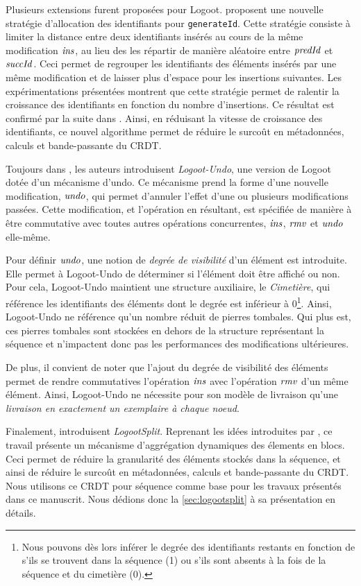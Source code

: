 Plusieurs extensions furent proposées pour Logoot.
\textcite{2010-logoot-undo-weiss} proposent une nouvelle stratégie d'allocation des identifiants pour \texttt{generateId}.
Cette stratégie consiste à limiter la distance entre deux identifiants insérés au cours de la même modification $\mathit{ins}$, au lieu des les répartir de manière aléatoire entre $\mathit{predId}$ et $\mathit{succId}$.
Ceci permet de regrouper les identifiants des éléments insérés par une même modification et de laisser plus d'espace pour les insertions suivantes.
Les expérimentations présentées montrent que cette stratégie permet de ralentir la croissance des identifiants en fonction du nombre d'insertions.
Ce résultat est confirmé par la suite dans \cite{2011-evaluation-crdts-ahmed-nacer}.
Ainsi, en réduisant la vitesse de croissance des identifiants, ce nouvel algorithme permet de réduire le surcoût en métadonnées, calculs et bande-passante du \ac{CRDT}.

Toujours dans \cite{2010-logoot-undo-weiss}, les auteurs introduisent \emph{Logoot-Undo}, une version de Logoot dotée d'un mécanisme d'undo.
Ce mécanisme prend la forme d'une nouvelle modification, $\mathit{undo}$, qui permet d'annuler l'effet d'une ou plusieurs modifications passées.
Cette modification, et l'opération en résultant, est spécifiée de manière à être commutative avec toutes autres opérations concurrentes, \ie $\mathit{ins}$, $\mathit{rmv}$ et $\mathit{undo}$ elle-même.

Pour définir $\mathit{undo}$, une notion de \emph{degrée de visibilité} d'un élément est introduite.
Elle permet à Logoot-Undo de déterminer si l'élément doit être affiché ou non.
Pour cela, Logoot-Undo maintient une structure auxiliaire, le \emph{Cimetière}, qui référence les identifiants des éléments dont le degrée est inférieur à 0\footnote{Nous pouvons dès lors inférer le degrée des identifiants restants en fonction de s'ils se trouvent dans la séquence (1) ou s'ils sont absents à la fois de la séquence et du cimetière (0).}.
Ainsi, Logoot-Undo ne référence qu'un nombre réduit de pierres tombales.
Qui plus est, ces pierres tombales sont stockées en dehors de la structure représentant la séquence et n'impactent donc pas les performances des modifications ultérieures.

De plus, il convient de noter que l'ajout du degrée de visibilité des éléments permet de rendre commutatives l'opération $\mathit{ins}$ avec l'opération $\mathit{rmv}$ d'un même élément.
Ainsi, Logoot-Undo ne nécessite pour son modèle de livraison qu'une \emph{livraison en exactement un exemplaire à chaque noeud}.

Finalement, \textcite{2013-logootsplit} introduisent \emph{LogootSplit}.
Reprenant les idées introduites par \cite{2012-string-wise}, ce travail présente un mécanisme d'aggrégation dynamiques des élements en blocs.
Ceci permet de réduire la granularité des éléments stockés dans la séquence, et ainsi de réduire le surcoût en métadonnées, calculs et bande-passante du \ac{CRDT}.
Nous utilisons ce \ac{CRDT} pour séquence comme base pour les travaux présentés dans ce manuscrit.
Nous dédions donc la \autoref{sec:logootsplit} à sa présentation en détails.

